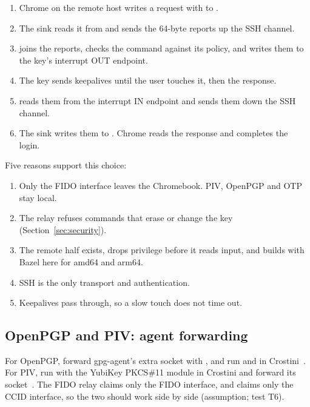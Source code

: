 \begin{example}
\label{ex:login}
\begin{enumerate}
\item Chrome on the remote host writes a  request with
       to .
\item The sink reads it from  and sends the 64-byte reports
      up the SSH channel.
\item {} joins the reports, checks the command against its
      policy, and writes them to the key's interrupt OUT endpoint.
\item The key sends keepalives until the user touches it, then the
      response.
\item {} reads them from the interrupt IN endpoint and sends
      them down the SSH channel.
\item The sink writes them to . Chrome reads the response
      and completes the login.
\end{enumerate}
\end{example}

Five reasons support this choice:
\begin{enumerate}
\item Only the FIDO interface leaves the Chromebook. PIV, OpenPGP and OTP
      stay local.
\item The relay refuses commands that erase or change the key
      (Section~\ref{sec:security}).
\item The remote half exists, drops privilege before it reads input, and
      builds with Bazel here for amd64 and arm64.
\item SSH is the only transport and authentication.
\item Keepalives pass through, so a slow touch does not time out.
\end{enumerate}

\subsection{OpenPGP and PIV: agent forwarding}

For OpenPGP, forward gpg-agent's extra socket with , and
run  and  in Crostini~\cite{gnupgfwd}. For PIV,
run  with the YubiKey PKCS\#11 module in Crostini and
forward its socket~\cite{p11kit}. The FIDO relay claims only the FIDO
interface, and  claims only the CCID interface, so the two should
work side by side (assumption; test T6).

